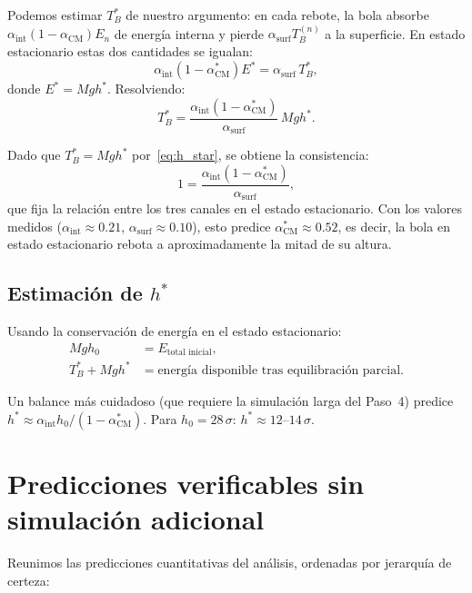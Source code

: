\documentclass[11pt, a4paper]{article}
\begin{document}
Podemos estimar $T_B^*$ de nuestro argumento: en cada rebote, la bola
absorbe $\alpha_\text{int}(1-\alpha_\text{CM})E_n$ de energía interna y
pierde $\alpha_\text{surf}T_B^{(n)}$ a la superficie. En estado
estacionario estas dos cantidades se igualan:
\begin{equation}
  \alpha_\text{int}(1-\alpha_\text{CM}^*)E^* = \alpha_\text{surf}\,T_B^*,
\end{equation}
donde $E^* = Mgh^*$. Resolviendo:
\begin{equation}
  T_B^* = \frac{\alpha_\text{int}(1-\alpha_\text{CM}^*)}
               {\alpha_\text{surf}}\,Mgh^*.
\end{equation}

Dado que $T_B^* = Mgh^*$ por~\eqref{eq:h_star}, se obtiene la
consistencia:
\begin{equation}
  1 = \frac{\alpha_\text{int}(1-\alpha_\text{CM}^*)}{\alpha_\text{surf}},
\end{equation}
que fija la relación entre los tres canales en el estado estacionario.
Con los valores medidos ($\alpha_\text{int} \approx 0.21$,
$\alpha_\text{surf} \approx 0.10$), esto predice
$\alpha_\text{CM}^* \approx 0.52$, es decir, la bola en estado
estacionario rebota a aproximadamente la mitad de su altura.

\subsection{Estimación de \texorpdfstring{$h^*$}{h*}}

Usando la conservación de energía en el estado estacionario:
\begin{align}
  Mgh_0 &= E_\text{total inicial}, \\
  T_B^* + Mgh^* &= \text{energía disponible tras equilibración parcial}.
\end{align}

Un balance más cuidadoso (que requiere la simulación larga del Paso~4)
predice $h^* \approx \alpha_\text{int} h_0 / (1 - \alpha_\text{CM}^*)$.
Para $h_0 = 28\,\sigma$: $h^* \approx 12$--$14\,\sigma$.

\section{Predicciones verificables sin simulación adicional}

Reunimos las predicciones cuantitativas del análisis, ordenadas por
jerarquía de certeza:
\end{document}
